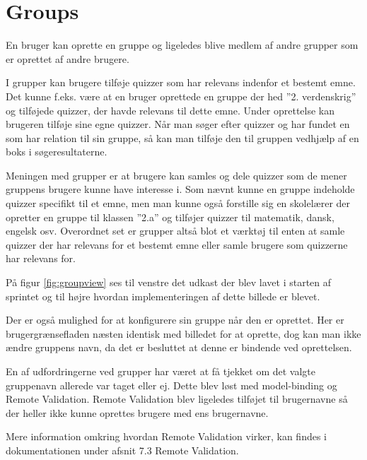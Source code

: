 \section{Groups}
En bruger kan oprette en gruppe og ligeledes blive medlem af andre grupper som er oprettet af andre brugere.

I grupper kan brugere tilføje quizzer som har relevans indenfor et bestemt emne. Det kunne f.eks. være at en bruger oprettede en gruppe der hed ''2. verdenskrig'' og tilføjede quizzer, der havde relevans til dette emne. Under oprettelse kan brugeren tilføje sine egne quizzer. Når man søger efter quizzer og har fundet en som har relation til sin gruppe, så kan man tilføje den til gruppen vedhjælp af en boks i søgeresultaterne.

Meningen med grupper er at brugere kan samles og dele quizzer som de mener gruppens brugere kunne have interesse i.  Som nævnt kunne en gruppe indeholde quizzer specifikt til et emne, men man kunne også forstille sig en skolelærer der opretter en gruppe til klassen ''2.a'' og tilføjer quizzer til matematik, dansk, engelsk osv. Overordnet set er grupper altså blot et værktøj til enten at samle quizzer der har relevans for et bestemt emne eller samle brugere som quizzerne har relevans for.


På figur \ref{fig:groupview} ses til venstre det udkast der blev lavet i starten af sprintet og til højre hvordan implementeringen af dette billede er blevet.

Der er også mulighed for at konfigurere sin gruppe når den er oprettet. Her er brugergrænsefladen næsten identisk med billedet for at oprette, dog kan man ikke ændre gruppens navn, da det er besluttet at denne er bindende ved oprettelsen.

En af udfordringerne ved grupper har været at få tjekket om det valgte gruppenavn allerede var taget eller ej. Dette blev løst med model-binding og Remote Validation. Remote Validation blev ligeledes tilføjet til brugernavne så der heller ikke kunne oprettes brugere med ens brugernavne.

Mere information omkring hvordan Remote Validation virker, kan findes i dokumentationen under afsnit 7.3 Remote Validation.
